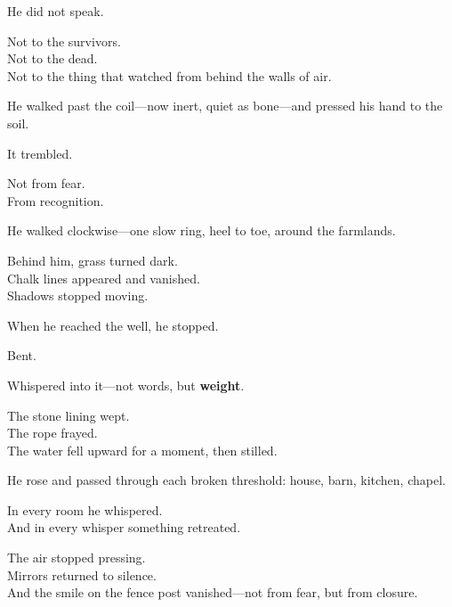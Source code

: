 \documentclass[9pt]{article}
\begin{document}
\vspace{0.5em}
He did not speak.

\vspace{0.5em}
Not to the survivors.\\
Not to the dead.\\
Not to the thing that watched from behind the walls of air.

\vspace{0.5em}
He walked past the coil---now inert, quiet as bone---and pressed his hand to the soil.

\vspace{0.5em}
It trembled.

\vspace{0.5em}
Not from fear.\\
From recognition.

\vspace{0.5em}
He walked clockwise---one slow ring, heel to toe, around the farmlands.

\vspace{0.5em}
Behind him, grass turned dark.\\
Chalk lines appeared and vanished.\\
Shadows stopped moving.

\vspace{0.5em}
When he reached the well, he stopped.

\vspace{0.5em}
Bent.

\vspace{0.5em}
Whispered into it---not words, but \textbf{weight}.

\vspace{0.5em}
The stone lining wept.\\
The rope frayed.\\
The water fell upward for a moment, then stilled.

\vspace{0.5em}
He rose and passed through each broken threshold: house, barn, kitchen, chapel.

\vspace{0.5em}
In every room he whispered.\\
And in every whisper something retreated.

\vspace{0.5em}
The air stopped pressing.\\
Mirrors returned to silence.\\
And the smile on the fence post vanished---not from fear, but from closure.
\end{document}
